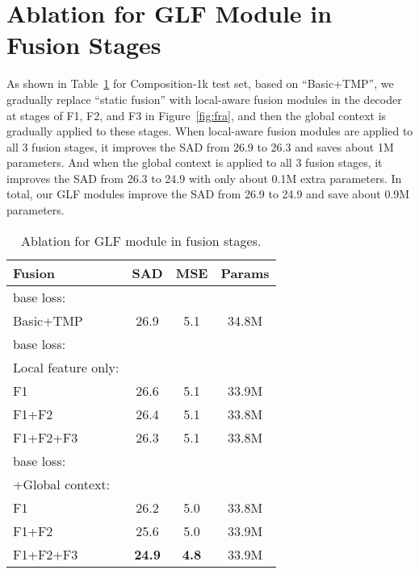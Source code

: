 \documentclass[10pt,twocolumn,letterpaper]{article}
\begin{document}
\section{Ablation for GLF Module in Fusion Stages}\label{app:fusion_stage}
As shown in Table~\ref{tabsupp:glf} for Composition-1k \cite{deepmatting} test set, based on ``Basic+TMP'', we gradually replace ``static fusion'' with local-aware fusion modules in the decoder at stages of F1, F2, and F3 in Figure~\ref{fig:fra}, and then the global context is gradually applied to these stages. When local-aware fusion modules are applied to all 3 fusion stages, it improves the SAD from 26.9 to 26.3 and saves about 1M parameters. And when the global context is applied to  all 3 fusion stages, it improves the SAD from 26.3 to 24.9 with only about 0.1M extra parameters. In total, our GLF modules  improve the SAD from 26.9 to 24.9 and save about 0.9M parameters.
\begin{table}[htb]
    \begin{center}
    \caption{Ablation for GLF module in fusion stages.}
    \begin{tabular}{lccc}
        \hline
        Fusion & SAD & MSE   & Params \\
        \hline
        base loss:\\
        Basic+TMP & 26.9 & 5.1 & 34.8M \\
        \hline
        base loss:\\
        Local feature only:\\
        F1&26.6 & 5.1 & 33.9M\\
        F1+F2 &26.4 & 5.1 & 33.8M \\ 
        F1+F2+F3&26.3 & 5.1 & 33.8M\\
        \hline
        base loss:\\
        +Global context:\\
        F1&26.2 & 5.0 & 33.8M\\
        F1+F2 &25.6 & 5.0 & 33.9M \\ 
        F1+F2+F3&\textbf{24.9} & \textbf{4.8} & 33.9M\\
        \hline
    \end{tabular}\label{tabsupp:glf}
    \end{center}
\end{table}
\end{document}
